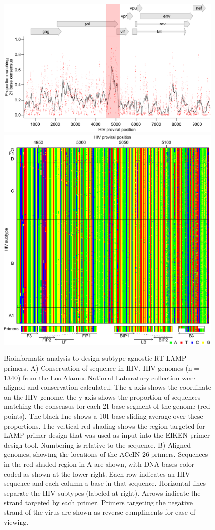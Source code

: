 \documentclass[../sherrill-Mix_thesis.tex]{subfiles}
\begin{document}
			\begin{figure}
			\centering
				\includegraphics[width=.6\textwidth]{consensus.pdf} %
				\includegraphics[width=.6\textwidth]{bases.pdf} %
			\caption[Bioinformatic analysis to design subtype-agnostic RT-LAMP primers]{Bioinformatic analysis to design subtype-agnostic RT-LAMP primers. A) Conservation of sequence in HIV. HIV genomes (n = 1340) from the Los Alamos National Laboratory collection were aligned and conservation calculated. The x-axis shows the coordinate on the HIV genome, the y-axis shows the proportion of sequences matching the consensus for each 21 base segment of the genome (red points). The black line shows a 101 base sliding average over these proportions. The vertical red shading shows the region targeted for LAMP primer design that was used as input into the EIKEN primer design tool. Numbering is relative to the \hivEight{} sequence. B) Aligned genomes, showing the locations of the ACeIN-26 primers. Sequences in the red shaded region in A are shown, with DNA bases color-coded as shown at the lower right. Each row indicates an HIV sequence and each column a base in that sequence. Horizontal lines separate the HIV subtypes (labeled at right). Arrows indicate the strand targeted by each primer. Primers targeting the negative strand of the virus are shown as reverse compliments for ease of viewing.}
			\label{figConsensus}
			\end{figure}
\end{document}
